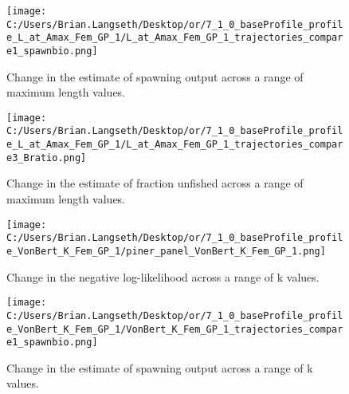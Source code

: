 \documentclass[11pt,
  english,
  a4paper,
]{article}
\begin{document}

\begin{figure}
\centering
\texttt{[image: C:/Users/Brian.Langseth/Desktop/or/7\_1\_0\_baseProfile\_profile\_L\_at\_Amax\_Fem\_GP\_1/L\_at\_Amax\_Fem\_GP\_1\_trajectories\_compare1\_spawnbio.png]}
\caption{Change in the estimate of spawning output across a range of maximum length values.\label{fig:linf-ssb}}
\end{figure}

\tagmcend\tagstructend


\begin{figure}
\centering
\texttt{[image: C:/Users/Brian.Langseth/Desktop/or/7\_1\_0\_baseProfile\_profile\_L\_at\_Amax\_Fem\_GP\_1/L\_at\_Amax\_Fem\_GP\_1\_trajectories\_compare3\_Bratio.png]}
\caption{Change in the estimate of fraction unfished across a range of maximum length values.\label{fig:linf-depl}}
\end{figure}

\tagmcend\tagstructend


\begin{figure}
\centering
\texttt{[image: C:/Users/Brian.Langseth/Desktop/or/7\_1\_0\_baseProfile\_profile\_VonBert\_K\_Fem\_GP\_1/piner\_panel\_VonBert\_K\_Fem\_GP\_1.png]}
\caption{Change in the negative log-likelihood across a range of k values.\label{fig:k-profile}}
\end{figure}

\tagmcend\tagstructend


\begin{figure}
\centering
\texttt{[image: C:/Users/Brian.Langseth/Desktop/or/7\_1\_0\_baseProfile\_profile\_VonBert\_K\_Fem\_GP\_1/VonBert\_K\_Fem\_GP\_1\_trajectories\_compare1\_spawnbio.png]}
\caption{Change in the estimate of spawning output across a range of k values.\label{fig:k-ssb}}
\end{figure}
\end{document}
